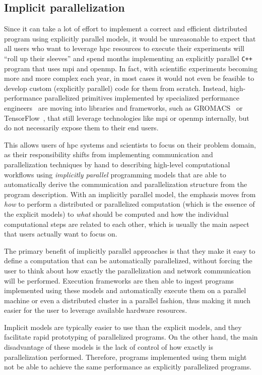 \subsection*{Implicit parallelization}
Since it can take a lot of effort to implement a correct and efficient distributed program using
explicitly parallel models, it would be unreasonable to expect that all users who want to leverage
\gls{hpc} resources to execute their experiments will ``roll up their sleeves'' and
spend months implementing an explicitly parallel \texttt{C++} program that uses
\gls{mpi} and \gls{openmp}. In fact, with scientific experiments becoming
more and more complex each year, in most cases it would not even be feasible to develop custom
(explicitly parallel) code for them from scratch. Instead, high-performance parallelized primitives
implemented by specialized performance engineers~\cite{dace} are moving into libraries
and frameworks, such as GROMACS~\cite{gromacs,gromacs_mpi} or TensorFlow~\cite{tensorflow,horovod}, that
still leverage technologies like \gls{mpi} or \gls{openmp} internally, but
do not necessarily expose them to their end users.

This allows users of \gls{hpc} systems and scientists to focus on their problem
domain, as their responsibility shifts from implementing communication and parallelization
techniques by hand to describing high-level computational workflows using \emph{implicitly parallel}
programming models that are able to automatically derive the communication and parallelization
structure from the program description. With an implicitly parallel model, the emphasis moves from
\emph{how} to perform a distributed or parallelized computation (which is the essence
of the explicit models) to \emph{what} should be computed and how the individual
computational steps are related to each other, which is usually the main aspect that users actually
want to focus on.

The primary benefit of implicitly parallel approaches is that they make it easy to define a
computation that can be automatically parallelized, without forcing the user to think about how
exactly the parallelization and network communication will be performed. Execution frameworks are
then able to ingest programs implemented using these models and automatically execute them on a
parallel machine or even a distributed cluster in a parallel fashion, thus making it much easier
for the user to leverage available hardware resources.

Implicit models are typically easier to use than the explicit models, and they facilitate rapid
prototyping of parallelized programs. On the other hand, the main disadvantage of these models is
the lack of control of how exactly is parallelization performed. Therefore, programs implemented
using them might not be able to achieve the same performance as explicitly parallelized programs.

